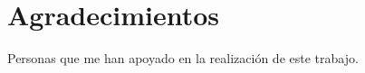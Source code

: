 \newpage
~
\newpage
\section{Agradecimientos}
Personas que me han apoyado en la realización de este trabajo.
